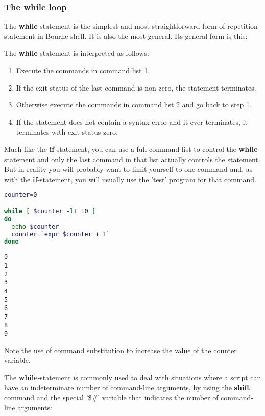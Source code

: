 \subsubsection{The while loop}
The \textbf{while}-statement is the simplest and most straightforward form of
repetition statement in Bourne shell. It is also the most general. Its general
form is this:

\begin{comment}
\textbf{while} \emph{command-list1}
\textbf{do} \emph{command-list2}
\textbf{done}
\end{comment}

The \textbf{while}-statement is interpreted as follows:
\begin{enumerate}
	\item Execute the commands in command list 1.
	\item If the exit status of the last command is non-zero, the statement
terminates.
	\item Otherwise execute the commands in command list 2 and go back to step
1.
	\item If the statement does not contain a syntax error and it ever
terminates, it terminates with exit status zero.
\end{enumerate}

Much like the \textbf{if}-statement, you can use a full command list to control
the \textbf{while}-statement and only the last command in that list actually
controls the statement. But in reality you will probably want to limit yourself
to one command and, as with the \textbf{if}-statement, you will usually use the
'test' program for that command.

\lstset{basicstyle=\scriptsize, numbers=left, captionpos=b, tabsize=4}
\begin{lstlisting}[caption=A while loop that prints all the values between 0 and 10,language={bash},
breaklines=true,xleftmargin=15pt,label=lst:A while loop that prints all the values between 0 and 10]
counter=0

while [ $counter -lt 10 ]
do
  echo $counter
  counter=`expr $counter + 1`
done
\end{lstlisting}

\scriptsize
\begin{verbatim}
0
1
2
3
4
5
6
7
8
9
\end{verbatim}
\normalsize
Note the use of command substitution to increase the value of the counter
variable.

The \textbf{while}-statement is commonly used to deal with situations where a
script can have an indeterminate number of command-line arguments, by using the
\textbf{shift} command and the special '\$\#' variable that indicates the
number of command-line arguments:

